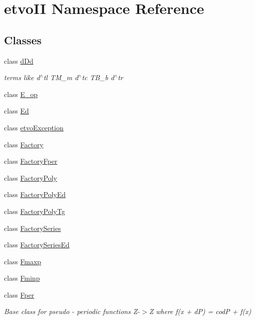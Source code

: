 \hypertarget{namespaceetvo_i_i}{}\section{etvo\+II Namespace Reference}
\label{namespaceetvo_i_i}
\subsection*{Classes}
\begin{DoxyCompactItemize}
\item 
class \mbox{\hyperlink{classetvo_i_i_1_1d_dd}{d\+Dd}}
\begin{DoxyCompactList}\small\item\em terms like d$^\wedge$tl T\+M\+\_\+m d$^\wedge$tc T\+B\+\_\+b d$^\wedge$tr \end{DoxyCompactList}\item 
class \mbox{\hyperlink{classetvo_i_i_1_1_e__op}{E\+\_\+op}}
\item 
class \mbox{\hyperlink{classetvo_i_i_1_1_ed}{Ed}}
\item 
class \mbox{\hyperlink{classetvo_i_i_1_1etvo_exception}{etvo\+Exception}}
\item 
class \mbox{\hyperlink{classetvo_i_i_1_1_factory}{Factory}}
\item 
class \mbox{\hyperlink{classetvo_i_i_1_1_factory_fper}{Factory\+Fper}}
\item 
class \mbox{\hyperlink{classetvo_i_i_1_1_factory_poly}{Factory\+Poly}}
\item 
class \mbox{\hyperlink{classetvo_i_i_1_1_factory_poly_ed}{Factory\+Poly\+Ed}}
\item 
class \mbox{\hyperlink{classetvo_i_i_1_1_factory_poly_tg}{Factory\+Poly\+Tg}}
\item 
class \mbox{\hyperlink{classetvo_i_i_1_1_factory_series}{Factory\+Series}}
\item 
class \mbox{\hyperlink{classetvo_i_i_1_1_factory_series_ed}{Factory\+Series\+Ed}}
\item 
class \mbox{\hyperlink{classetvo_i_i_1_1_fmaxp}{Fmaxp}}
\item 
class \mbox{\hyperlink{classetvo_i_i_1_1_fminp}{Fminp}}
\item 
class \mbox{\hyperlink{classetvo_i_i_1_1_fper}{Fper}}
\begin{DoxyCompactList}\small\item\em Base class for pseudo -\/ periodic functions Z-\/$>$Z where f(x + dP) = codP + f(x) \end{DoxyCompactList}\item 

\end{DoxyCompactItemize}
